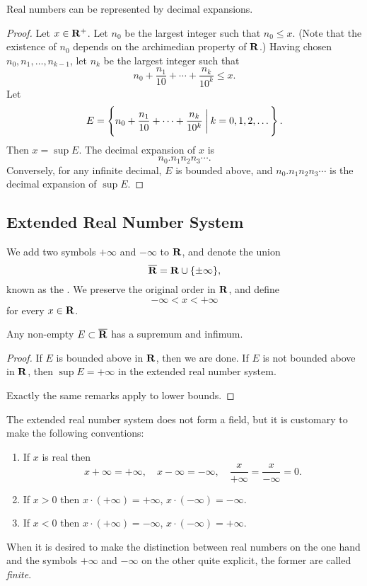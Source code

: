 \begin{proposition}
Real numbers can be represented by decimal expansions.
\end{proposition}

\begin{proof}
Let $x\in\mathbf R^+$. Let $n_0$ be the largest integer such that $n_0\le x$. (Note that the existence of $n_0$ depends on the archimedian property of $\mathbf R$.) Having chosen $n_0,n_1,\dots,n_{k-1}$, let $n_k$ be the largest integer such that
\[n_0+\frac{n_1}{10}+\cdots+\frac{n_k}{10^k}\le x.\]
Let
\[E=\left\{n_0+\frac{n_1}{10}+\cdots+\frac{n_k}{10^k}\:\bigg|\:k=0,1,2,\dots\right\}.\]
Then $x=\sup E$. The decimal expansion of $x$ is
\[n_0.n_1n_2n_3\cdots.\]
Conversely, for any infinite decimal, $E$ is bounded above, and $n_0.n_1n_2n_3\cdots$ is the decimal expansion of $\sup E$.
\end{proof}

\subsection{Extended Real Number System}
\begin{definition}
We add two symbols $+\infty$ and $-\infty$ to $\mathbf R$, and denote the union
\[\overline{\mathbf R}=\mathbf R\cup\{\pm\infty\},\]
known as the . We preserve the original order in $\mathbf R$, and define
\[-\infty<x<+\infty\]
for every $x\in\mathbf R$.
\end{definition}

\begin{proposition}
Any non-empty $E\subset\overline{\mathbf R}$ has a supremum and infimum.
\end{proposition}

\begin{proof}
If $E$ is bounded above in $\mathbf R$, then we are done. If $E$ is not bounded above in $\mathbf R$, then $\sup E=+\infty$ in the extended real number system.

Exactly the same remarks apply to lower bounds.
\end{proof}

The extended real number system does not form a field, but it is customary to make the following conventions:
\begin{enumerate}[label=(\roman*)]
\item If $x$ is real then
\[ x+\infty=+\infty, \quad x-\infty=-\infty, \quad \frac{x}{+\infty}=\frac{x}{-\infty}=0. \]
\item If $x>0$ then $x\cdot(+\infty)=+\infty$, $x\cdot(-\infty)=-\infty$.
\item If $x<0$ then $x\cdot(+\infty)=-\infty$, $x\cdot(-\infty)=+\infty$.
\end{enumerate}
When it is desired to make the distinction between real numbers on the one hand and the symbols $+\infty$ and $-\infty$ on the other quite explicit, the former are called \emph{finite}.

